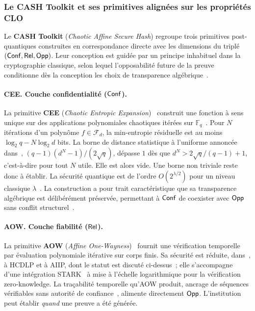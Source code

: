 \begin{sloppypar}
\subsubsection{Le CASH Toolkit et ses primitives align\'ees sur les propri\'et\'es CLO}
\label{subsubsec:cash_toolkit}

Le \textbf{CASH Toolkit} (\textit{Chaotic Affine Secure Hash}) regroupe trois
primitives post-quantiques construites en correspondance directe avec les
dimensions du tripl\'e~$(\mathsf{Conf}, \mathsf{Rel}, \mathsf{Opp})$. Leur conception est guid\'ee par
un principe inhabituel dans la cryptographie classique, selon lequel l'opposabilit\'e
future de la preuve conditionne d\`es la conception les choix de transparence
alg\'ebrique~\cite{MINKA2026CLO,Casey11}.

\paragraph{CEE. Couche confidentialit\'e ($\mathsf{Conf}$).}
La primitive \textbf{CEE} (\textit{Chaotic Entropic
Expansion})~\cite{MINKA2025CEE} construit une fonction \`a sens unique sur des
applications polynomiales chaotiques it\'er\'ees sur
$\mathbb{F}_q$~\cite{Menezes1996,Stinson2005}. Pour $N$ it\'erations d'un
polyn\^ome $f \in \mathcal{F}_d$, la min-entropie r\'esiduelle est au moins
$\log_2 q - N\log_2 d$ bits. La borne de distance statistique \`a l'uniforme
annonc\'ee dans~\cite{MINKA2025CEE}, $(q-1)(d^N-1)/(2\sqrt{q})$, d\'epasse $1$ d\`es
que $d^N > 2\sqrt{q}/(q-1) + 1$, c'est-\`a-dire pour tout $N$ utile. Elle est
alors vide. Une borne non triviale reste donc \`a \'etablir. La s\'ecurit\'e
quantique est de l'ordre $O(2^{\lambda/2})$ pour un niveau classique
$\lambda$~\cite{NielsenChuang2010}. La construction a pour trait caract\'eristique que sa transparence
alg\'ebrique est d\'elib\'er\'ement pr\'eserv\'ee, permettant
\`a $\mathsf{Conf}$ de coexister avec $\mathsf{Opp}$ sans conflit structurel~\cite{MINKA2026CLO}.

\paragraph{AOW. Couche fiabilit\'e ($\mathsf{Rel}$).}
La primitive \textbf{AOW} (\textit{Affine One-Wayness})~\cite{MINKA2025AOW}
fournit une v\'erification temporelle par \'evaluation polynomiale it\'erative
sur corps finis. Sa s\'ecurit\'e est r\'eduite, dans~\cite{MINKA2025AOW}, \`a HCDLP
et \`a AIIP, dont le statut est discut\'e ci-dessus~; elle s'accompagne d'une int\'egration
STARK~\cite{STARKs18,BenSasson2018} \`a mise \`a l'\'echelle logarithmique
pour la v\'erification zero-knowledge. La tra\c{c}abilit\'e temporelle qu'AOW
produit, ancrage de s\'equences v\'erifiables sans autorit\'e de
confiance~\cite{Haber1991,Bayer1993}, alimente directement $\mathsf{Opp}$.
L'institution peut \'etablir \emph{quand} une preuve a \'et\'e g\'en\'er\'ee.


\end{sloppypar}
